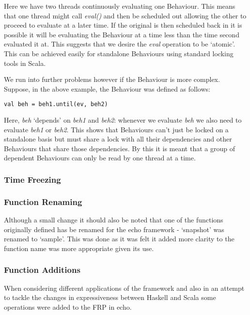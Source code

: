 \documentclass[12pt]{article}
\begin{document}
        Here we have two threads continuously evaluating one Behaviour. This means that one thread
        might call \emph{eval()} and then be scheduled out allowing the other to proceed to evaluate
        at a later time. If the original is then scheduled back in it is possible it will
        be evaluating the Behaviour at a time less than the time second evaluated it at. This suggests
        that we desire the \emph{eval} operation to be `atomic'. This can be achieved easily for standalone
        Behaviours using standard locking tools in Scala.
        
        We run into further problems however if the Behaviour is more complex. Suppose, in the above example,
        the Behaviour was defined as follows:

\begin{verbatim}
val beh = beh1.until(ev, beh2)
\end{verbatim}        

        Here, \emph{beh} `depends' on \emph{beh1} and \emph{beh2}: whenever we evaluate \emph{beh}
        we also need to evaluate \emph{beh1} or \emph{beh2}. This shows that Behaviours can't just
        be locked on a standalone basis but must share a lock with all their dependencies and other Behaviours
        that share those dependencies. By this it is meant that a group of dependent Behaviours can
        only be read by one thread at a time.
        
      \subsubsection{Time Freezing}
      
      \subsubsection{Function Renaming}
        Although a small change it should also be noted that one of the functions originally defined
        has be renamed for the echo framework - `snapshot' was renamed to `sample'. This was done as
        it was felt it added more clarity to the function name was more appropriate given its use.
        
      \subsubsection{Function Additions}
        When considering different applications of the framework and also in an attempt to
        tackle the changes in expressiveness between Haskell and Scala some operations
        were added to the FRP in echo.
        
\end{document}
